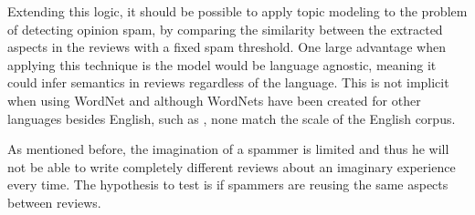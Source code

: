 Extending this logic, it should be possible to apply topic modeling to the problem of detecting opinion spam, by comparing the similarity between the extracted aspects in the reviews with a fixed spam threshold. One large advantage when applying this technique is the model would be language agnostic, meaning it could infer semantics in reviews regardless of the language. This is not implicit when using WordNet and although WordNets have been created for other languages besides English, such as \citet{EuroWordNet}, none match the scale of the English corpus.

As mentioned before, the imagination of a spammer is limited and thus he will not be able to write completely different reviews about an imaginary experience every time. The hypothesis to test is if spammers are reusing the same aspects between reviews.
